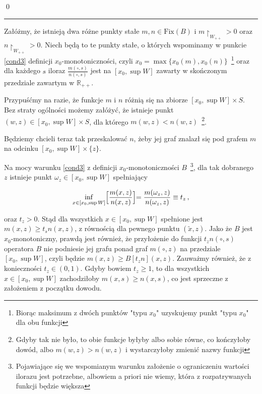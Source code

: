 \qed
\newline

\hrule
\begin{dowod}\label{proof_uniqueness}
\end{dowod}

	Załóżmy, że istnieją dwa różne punkty stałe $m, n \in \mathrm{Fix}(B)$ i $m\restriction_{W_{++}} > 0$ oraz $n\restriction_{W_{++}} > 0$. Niech będą to te punkty stałe, o których wspominamy w punkcie \ref{cond3} definicji $x_0$-monotoniczności, czyli $x_0 = \max \{ x_0 (m), x_0(n) \}$~\footnote{Biorąc maksimum z dwóch punktów "typu $x_0$" uzyskujemy punkt "typu $x_0$" dla obu funkcji} oraz dla każdego $s$ iloraz $\frac{m(\circ, s)}{n(\circ, s)}$ jest na $[x_0, \sup W]$ zawarty w skończonym przedziale zawartym w $\mathbb{R}_{++}$. 
	 
	
	Przypuśćmy na razie, że funkcje $m$ i $n$ różnią się na zbiorze $[x_0, \sup W] \times S$. Bez straty ogólności możemy załóżyć, że istnieje punkt $(w,z) \in [x_0, \sup W] \times S$, dla którego $m(w,z) < n(w,z)$~\footnote{Gdyby tak nie było, to obie funkcje byłyby albo sobie równe, co kończyłoby dowód, albo $m(w,z) > n(w,z)$ i wystarczyłoby zmienić nazwy funkcji}. 
	
	Będziemy chcieli teraz tak przeskalować $n$, żeby jej graf znalazł się pod grafem $m$ na odcinku $[x_0, \sup W] \times \{ z\}$.
	
	Na mocy warunku \ref{cond3} z definicji $x_0$-monotoniczności $B$~\footnote{Pojawiające się we wspomianym warunku założenie o ograniczeniu wartości ilorazu jest potrzebne, albowiem a priori nie wiemy, która z rozpatrywanych funkcji będzie większa}, dla tak dobranego $z $ istnieje punkt $\omega_{z} \in [x_0, \sup W]$ spełniający
  
\begin{equation*}
	\underset{x \in [x_0, \sup W]}{\inf} \Bigl[ \frac{m(x,z)}{n(x,z)}\Bigl] =  \frac{m(\omega_z, z)}{n(\omega_z,z)} \equiv t_z\,,
\end{equation*}

oraz $t_z >0$. Stąd dla wszystkich $x \in [x_0, \sup W]$ spełnione jest $m(x,z) \geq t_s n(x,z)$, z równością dla pewnego punktu $(\tilde{x}, z)$. Jako że $B$ jest $x_0$-monotoniczny, prawdą jest również, że przyłożenie do funkcji $t_z n(\circ, s)$ operatora $B$ nie podniesie jej grafu ponad graf $m(\circ,z)$ na przedziale $[x_0, \sup W]$, czyli będzie  $m(x,z) \geq B[t_z n](x,z)$. Zauważmy również, że z konieczności $t_z \in (0,1)$. Gdyby bowiem $t_z \geq 1$, to dla wszystkich $x \in [x_0, \sup W]$ zachodziłoby $m(x,s) \geq n(x,s)$, co jest sprzeczne z założeniem z początku dowodu. 

